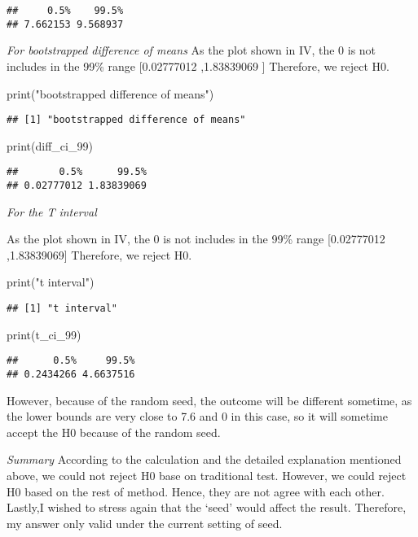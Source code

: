 \documentclass[
]{article}
\newenvironment{Shaded}{\begin{snugshade}}{\end{snugshade}}
\newcommand{\FunctionTok}[1]{\textcolor[rgb]{0.00,0.00,0.00}{#1}}
\newcommand{\NormalTok}[1]{#1}
\newcommand{\StringTok}[1]{\textcolor[rgb]{0.31,0.60,0.02}{#1}}
\begin{document}
\begin{verbatim}
##     0.5%    99.5% 
## 7.662153 9.568937
\end{verbatim}

\emph{For bootstrapped difference of means } As the plot shown in IV,
the 0 is not includes in the 99\% range {[}0.02777012 ,1.83839069 {]}
Therefore, we reject H0.

\begin{Shaded}
\begin{Highlighting}[]
\FunctionTok{print}\NormalTok{(}\StringTok{"bootstrapped difference of means"}\NormalTok{)}
\end{Highlighting}
\end{Shaded}

\begin{verbatim}
## [1] "bootstrapped difference of means"
\end{verbatim}

\begin{Shaded}
\begin{Highlighting}[]
\FunctionTok{print}\NormalTok{(diff\_ci\_99)}
\end{Highlighting}
\end{Shaded}

\begin{verbatim}
##       0.5%      99.5% 
## 0.02777012 1.83839069
\end{verbatim}

\emph{For the T interval }

As the plot shown in IV, the 0 is not includes in the 99\% range
{[}0.02777012 ,1.83839069{]} Therefore, we reject H0.

\begin{Shaded}
\begin{Highlighting}[]
\FunctionTok{print}\NormalTok{(}\StringTok{"t interval"}\NormalTok{)}
\end{Highlighting}
\end{Shaded}

\begin{verbatim}
## [1] "t interval"
\end{verbatim}

\begin{Shaded}
\begin{Highlighting}[]
\FunctionTok{print}\NormalTok{(t\_ci\_99)}
\end{Highlighting}
\end{Shaded}

\begin{verbatim}
##      0.5%     99.5% 
## 0.2434266 4.6637516
\end{verbatim}

However, because of the random seed, the outcome will be different
sometime, as the lower bounds are very close to 7.6 and 0 in this case,
so it will sometime accept the H0 because of the random seed.

\emph{Summary} According to the calculation and the detailed explanation
mentioned above, we could not reject H0 base on traditional test.
However, we could reject H0 based on the rest of method. Hence, they are
not agree with each other. Lastly,I wished to stress again that the
`seed' would affect the result. Therefore, my answer only valid under
the current setting of seed.
\end{document}
